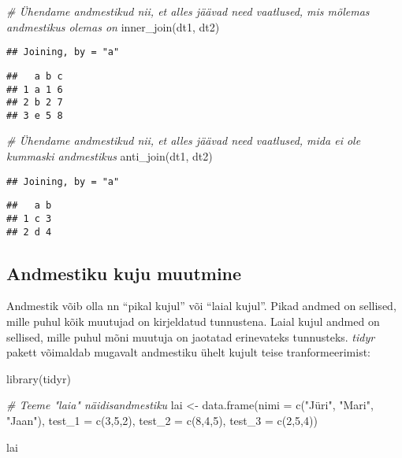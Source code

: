 \documentclass[
]{book}
\newenvironment{Shaded}{\begin{snugshade}}{\end{snugshade}}
\newcommand{\AttributeTok}[1]{\textcolor[rgb]{0.77,0.63,0.00}{#1}}
\newcommand{\CommentTok}[1]{\textcolor[rgb]{0.56,0.35,0.01}{\textit{#1}}}
\newcommand{\DecValTok}[1]{\textcolor[rgb]{0.00,0.00,0.81}{#1}}
\newcommand{\FunctionTok}[1]{\textcolor[rgb]{0.00,0.00,0.00}{#1}}
\newcommand{\NormalTok}[1]{#1}
\newcommand{\OtherTok}[1]{\textcolor[rgb]{0.56,0.35,0.01}{#1}}
\newcommand{\StringTok}[1]{\textcolor[rgb]{0.31,0.60,0.02}{#1}}
\begin{document}
\begin{Shaded}
\begin{Highlighting}[]
\CommentTok{\# Ühendame andmestikud nii, et alles jäävad need vaatlused, mis mõlemas andmestikus olemas on}
\FunctionTok{inner\_join}\NormalTok{(dt1, dt2)}
\end{Highlighting}
\end{Shaded}

\begin{verbatim}
## Joining, by = "a"
\end{verbatim}

\begin{verbatim}
##   a b c
## 1 a 1 6
## 2 b 2 7
## 3 e 5 8
\end{verbatim}

\begin{Shaded}
\begin{Highlighting}[]
\CommentTok{\# Ühendame andmestikud nii, et alles jäävad need vaatlused, mida ei ole kummaski andmestikus}
\FunctionTok{anti\_join}\NormalTok{(dt1, dt2)}
\end{Highlighting}
\end{Shaded}

\begin{verbatim}
## Joining, by = "a"
\end{verbatim}

\begin{verbatim}
##   a b
## 1 c 3
## 2 d 4
\end{verbatim}

\hypertarget{andmestiku-kuju-muutmine}{%
\subsection{Andmestiku kuju muutmine}\label{andmestiku-kuju-muutmine}}

Andmestik võib olla nn ``pikal kujul'' või ``laial kujul''. Pikad andmed on sellised, mille puhul kõik muutujad on kirjeldatud tunnustena. Laial kujul andmed on sellised, mille puhul mõni muutuja on jaotatad erinevateks tunnusteks. \emph{tidyr} pakett võimaldab mugavalt andmestiku ühelt kujult teise tranformeerimist:

\begin{Shaded}
\begin{Highlighting}[]
\FunctionTok{library}\NormalTok{(tidyr)}

\CommentTok{\# Teeme "laia" näidisandmestiku}
\NormalTok{lai }\OtherTok{\textless{}{-}} \FunctionTok{data.frame}\NormalTok{(}\AttributeTok{nimi =} \FunctionTok{c}\NormalTok{(}\StringTok{"Jüri"}\NormalTok{, }\StringTok{"Mari"}\NormalTok{, }\StringTok{"Jaan"}\NormalTok{), }
                 \AttributeTok{test\_1 =} \FunctionTok{c}\NormalTok{(}\DecValTok{3}\NormalTok{,}\DecValTok{5}\NormalTok{,}\DecValTok{2}\NormalTok{), }
                 \AttributeTok{test\_2 =} \FunctionTok{c}\NormalTok{(}\DecValTok{8}\NormalTok{,}\DecValTok{4}\NormalTok{,}\DecValTok{5}\NormalTok{),}
                 \AttributeTok{test\_3 =} \FunctionTok{c}\NormalTok{(}\DecValTok{2}\NormalTok{,}\DecValTok{5}\NormalTok{,}\DecValTok{4}\NormalTok{))}

\NormalTok{lai}
\end{Highlighting}
\end{Shaded}
\end{document}
